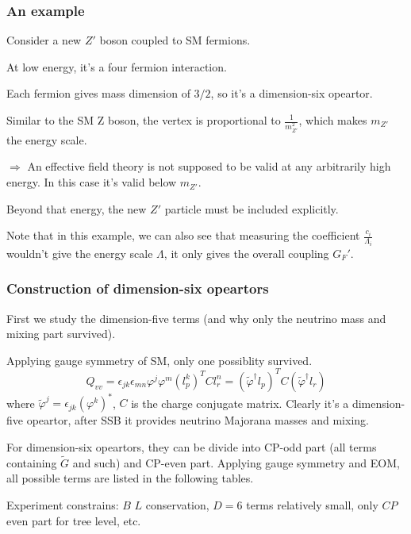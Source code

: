 \documentclass[8pt]{beamer}
\begin{document}
\begin{frame}
  \frametitle{An example}
  Consider a new $Z'$ boson coupled to SM fermions.

  At low energy, it's a four fermion interaction.

  Each fermion gives mass dimension of $3/2$, so it's a dimension-six opeartor.

  Similar to the SM Z boson, the vertex is proportional to $\frac{1}{m_{Z'}^2}$, which makes $m_{Z'}$ the energy scale.

  $\Longrightarrow$ An effective field theory is not supposed to be valid at any arbitrarily high energy. In this case it's valid below $m_{Z'}$.

  Beyond that energy, the new $Z'$ particle must be included explicitly.

  Note that in this example, we can also see that measuring the coefficient $\frac{c_i}{\Lambda_i}$ wouldn't give the energy scale $\Lambda$, it only gives the overall coupling $G_F'$.
\end{frame}
\begin{frame}
  \frametitle{Construction of dimension-six opeartors}
  First we study the dimension-five terms (and why only the neutrino mass and mixing part survived).

  Applying gauge symmetry of SM, only one possiblity survived.
  $$Q_{vv}=\epsilon_{jk}\epsilon_{mn}\varphi^j\varphi^m(l^k_p)^TCl^n_r=(\tilde\varphi^{\dagger}l_p)^TC(\tilde \varphi^{\dagger}l_r)$$
  where $\tilde \varphi^j=\epsilon_{jk}(\varphi^k)^*$, $C$ is the charge conjugate matrix. Clearly it's a dimension-five opeartor, after SSB it provides neutrino Majorana masses and mixing.

  For dimension-six opeartors, they can be divide into CP-odd part (all terms containing $\tilde G$ and such) and CP-even part. Applying gauge symmetry and EOM, all possible terms are listed in the following tables.

  Experiment constrains: $B$ $L$ conservation, $D=6$ terms relatively small, only $CP$ even part for tree level, etc.




\end{frame}
\end{document}
